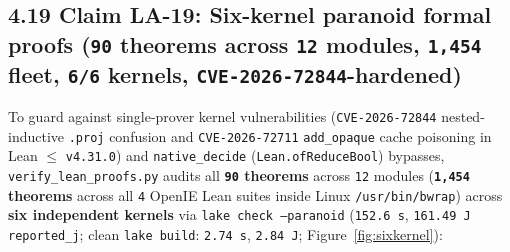 \documentclass[10pt]{article}
\begin{document}
\subsection{4.19 Claim LA-19: Six-kernel paranoid formal proofs (\texttt{90} theorems across \texttt{12} modules, \texttt{1,454} fleet, \texttt{6/6} kernels, \texttt{CVE-2026-72844}-hardened)}\label{claim-la19}

To guard against single-prover kernel vulnerabilities (\texttt{CVE-2026-72844} nested-inductive \texttt{.proj} confusion and \texttt{CVE-2026-72711} \texttt{add\_opaque} cache poisoning in Lean $\le$ \texttt{v4.31.0}) and \texttt{native\_decide} (\texttt{Lean.ofReduceBool}) bypasses, \texttt{verify\_lean\_proofs.py} audits all \textbf{\texttt{90} theorems} across \texttt{12} modules (\textbf{\texttt{1,454} theorems} across all \texttt{4} OpenIE Lean suites inside Linux \texttt{/usr/bin/bwrap}) across \textbf{six independent kernels} via \texttt{lake check --paranoid} (\texttt{152.6 s}, \texttt{161.49 J} \texttt{reported\_j}; clean \texttt{lake build}: \texttt{2.74 s}, \texttt{2.84 J}; Figure~\ref{fig:sixkernel}):
\end{document}
